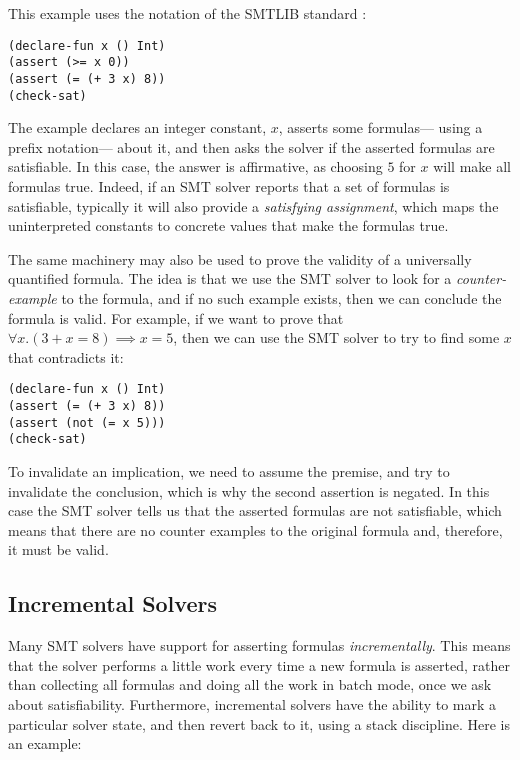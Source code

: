 \documentclass{sigplanconf}
\begin{document}
This example uses the notation of the SMTLIB standard \cite{smtlib2}:

\begin{Verbatim}
(declare-fun x () Int)
(assert (>= x 0))
(assert (= (+ 3 x) 8))
(check-sat)
\end{Verbatim}

The example declares an integer constant, $x$, asserts some formulas---%
using a prefix notation---%
about it, and then asks the solver if the asserted formulas are
satisfiable.  In this case, the answer is affirmative, as choosing
$5$ for $x$ will make all formulas true.  Indeed, if an
SMT solver reports that a set of formulas is satisfiable, typically
it will also provide a {\em satisfying assignment}, which maps
the uninterpreted constants to concrete values that make the
formulas true.

The same machinery may also be used to prove the validity of
a universally quantified formula. The idea is that we use the SMT solver
to look for a {\em counter-example} to the formula, and if no such
example exists, then we can conclude the formula is valid.
For example, if we want to prove that $\forall x. (3 + x = 8) \implies x = 5$,
then we can use the SMT solver to try to find some $x$ that contradicts it:

\begin{Verbatim}
(declare-fun x () Int)
(assert (= (+ 3 x) 8))
(assert (not (= x 5)))
(check-sat)
\end{Verbatim}

To invalidate an implication, we need to assume the premise, and try to
invalidate the conclusion, which is why the second assertion is negated.
In this case the SMT solver tells us that the asserted formulas are not
satisfiable, which means that there are no counter examples to the original
formula and, therefore, it must be valid.

\subsection{Incremental Solvers}

Many SMT solvers have support for asserting formulas {\em incrementally}.
This means that the solver performs a little work every time a new formula
is asserted, rather than collecting all formulas and doing all the work
in batch mode, once we ask about satisfiability.  Furthermore, incremental
solvers have the ability to mark a particular solver state, and then revert
back to it, using a stack discipline.  Here is an example:
\end{document}
